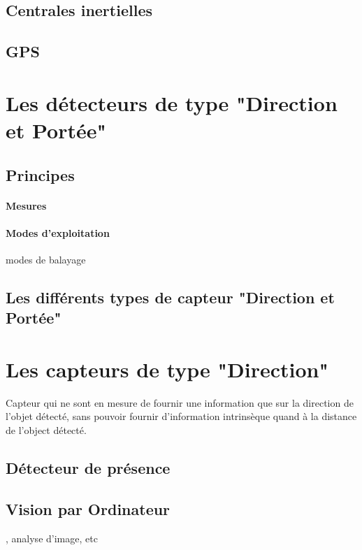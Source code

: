 \documentclass[12pt,a4paper]{report}
\begin{document}
\subsection{Centrales inertielles}

\subsection{GPS}

\section{Les détecteurs de type "Direction et Portée"}

\subsection{Principes}

\paragraph{Mesures}

\paragraph{Modes d'exploitation}
modes de balayage

\subsection{Les différents types de capteur "Direction et Portée"}

\section{Les capteurs de type "Direction"}
Capteur qui ne sont en mesure de fournir une information que sur la direction de l'objet détecté, sans pouvoir fournir d'information intrinsèque quand à la distance de l'object détecté.

\subsection{Détecteur de présence}

\subsection{Vision par Ordinateur}, analyse d'image, etc
\end{document}
